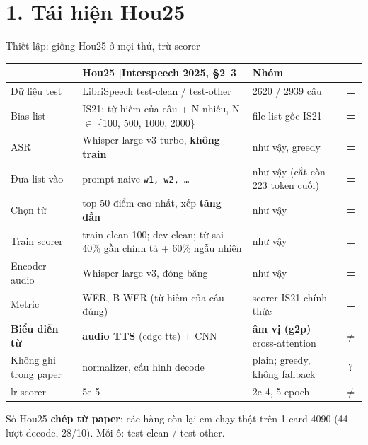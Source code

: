 \documentclass[aspectratio=169,xcolor=table]{beamer}
\newcommand{\hi}[1]{\textcolor{Primary}{\textbf{#1}}}
\newcommand{\bad}[1]{\textcolor{RiskRed}{\textbf{#1}}}
\newcommand{\good}[1]{\textcolor{GoodGreen}{\textbf{#1}}}
\newcommand{\src}[1]{{\tiny\color{TextGray}[#1]}}
\begin{document}
\section{1. Tái hiện Hou25}
\begin{frame}{Thiết lập: giống Hou25 ở mọi thứ, trừ scorer}
\centering\scriptsize\setlength{\tabcolsep}{4pt}
\begin{tabular}{p{2.6cm}p{4.6cm}p{4.6cm}c}
\toprule
 & Hou25 \src{Interspeech 2025, §2--3} & Nhóm & \\
\midrule
Dữ liệu test & LibriSpeech test-clean / test-other & 2620 / 2939 câu & \good{=}\\
Bias list & IS21: từ hiếm của câu + N nhiễu, N $\in$ \{100, 500, 1000, 2000\} & file list gốc IS21 & \good{=}\\
ASR & Whisper-large-v3-turbo, \textbf{không train} & như vậy, greedy & \good{=}\\
Đưa list vào & prompt naive \texttt{w1, w2, \ldots} & như vậy (cắt còn 223 token cuối) & \good{=}\\
Chọn từ & top-50 điểm cao nhất, xếp \textbf{tăng dần} & như vậy & \good{=}\\
Train scorer & train-clean-100; dev-clean; từ sai 40\% gần chính tả + 60\% ngẫu nhiên & như vậy & \good{=}\\
Encoder audio & Whisper-large-v3, đóng băng & như vậy & \good{=}\\
Metric & WER, B-WER (từ hiếm của câu đúng) & scorer IS21 chính thức & \good{=}\\
\midrule
\textbf{Biểu diễn từ} & \textbf{audio TTS} (edge-tts) + CNN & \hi{âm vị (g2p)} + cross-attention & \bad{$\neq$}\\
Không ghi trong paper & normalizer, cấu hình decode & plain; greedy, không fallback & ?\\
lr scorer & 5e-5 & 2e-4, 5 epoch & \bad{$\neq$}\\
\bottomrule
\end{tabular}\par
\raggedright\vspace{0.15cm}
{\footnotesize Số Hou25 \textbf{chép từ paper}; các hàng còn lại em chạy thật trên 1 card 4090 (44 lượt decode, 28/10). Mỗi ô: test-clean / test-other.}
\end{frame}
\end{document}
